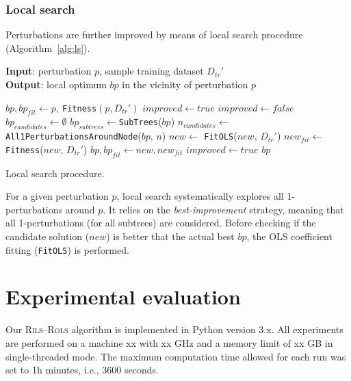 \documentclass[a4paper,12pt]{elsarticle}
\begin{document}
\subsubsection{Local search}\label{sec:ls}

Perturbations are further improved by means of local search procedure (Algorithm~\ref{alg:ls}). 

\begin{algorithm}
	\hspace*{\algorithmicindent} \textbf{Input}: perturbation $p$, sample training dataset $D_{tr}'$ \\
	\hspace*{\algorithmicindent} \textbf{Output}: local optimum $bp$ in the vicinity of perturbation $p$
	\begin{algorithmic}[1] 
		\State $bp, bp_{fit} \gets p,\ $\texttt{Fitness}$(p,D_{tr}')$ 
		\State $improved \gets true$
			\State $improved \gets false$
			\State $bp_{candidates} \gets \emptyset$
			\State $bp_{subtrees} \gets $\texttt{SubTrees}($bp$)
				\State $n_{candidates} \gets $ \texttt{All1PerturbationsAroundNode}($bp$, $n$)
					\State $new \gets$ \texttt{FitOLS}($new$, $D_{tr}'$)
					\State $new_{fit} \gets$ \texttt{Fitness}($new$, $D_{tr}'$)
						\State $bp, bp_{fit} \gets new, new_{fit}$
						\State $improved \gets true$
					\EndIf
				\EndFor
			\EndFor
		\EndWhile
		\State \Return $bp$
		\EndProcedure
	\end{algorithmic}
	\caption{Local search procedure.}
	\label{alg:ls}
\end{algorithm}  

For a given perturbation $p$, local search systematically explores all 1-perturbations around $p$. It relies on the \emph{best-improvement} strategy, meaning that all 1-perturbations (for all subtrees) are considered. Before checking if the candidate solution ($new$) is better that the actual best $bp$, the OLS coefficient fitting (\texttt{FitOLS}) is performed. 
   
\section{Experimental evaluation}\label{sec:experiments}

Our \textsc{Rils}--\textsc{Rols} algorithm is implemented in Python version 3.x. All experiments are performed on a machine xx with xx GHz and a memory limit of xx GB in single-threaded mode. The maximum computation time allowed for each run was set to 1h minutes, i.e., 3600 seconds.
 
\end{document}
